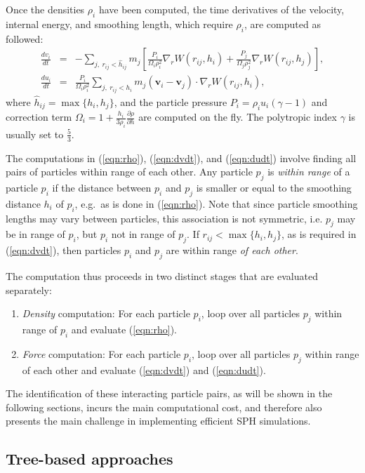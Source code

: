 \documentclass[final]{siamltex}
\newcommand{\eqn}[1]
    {(\ref{eqn:#1})}
\begin{document}
Once the densities $\rho_i$ have been computed,
the time derivatives
of the velocity, internal energy, and smoothing length, which
require $\rho_i$, are computed as followed:
%
\begin{eqnarray}
    \frac{dv_i}{dt} & = & -\sum_{j,~r_{ij} < \hat{h}_{ij}} m_j \left[
        \frac{P_i}{\Omega_i\rho_i^2}\nabla_rW(r_{ij},h_i) +
        \frac{P_j}{\Omega_j\rho_j^2}\nabla_rW(r_{ij},h_j) \right], \label{eqn:dvdt} \\ 
    \frac{du_i}{dt} & = & \frac{P_i}{\Omega_i\rho_i^2} \sum_{j,~r_{ij} < h_i} m_j(\mathbf v_i - \mathbf v_j) \cdot \nabla_rW(r_{ij},h_i), \label{eqn:dudt}
\end{eqnarray}
%
where $\hat{h}_{ij} = \max\{h_i,h_j\}$, and the particle pressure
$P_i=\rho_i u_i (\gamma-1)$ and correction term
$\Omega_i=1 + \frac{h_i}{3\rho_i}\frac{\partial \rho}{\partial h}$
are computed on the fly.
The polytropic index $\gamma$ is usually set to $\frac{5}{3}$.

The computations in \eqn{rho}, \eqn{dvdt}, and \eqn{dudt}
involve finding all pairs of particles
within range of each other.
Any particle $p_j$ is {\em within range} of a particle $p_i$
if the distance between $p_i$ and $p_j$ is smaller or equal
to the smoothing distance $h_i$ of $p_i$, e.g.~as is done in \eqn{rho}.
Note that since particle smoothing lengths may vary between particles,
this association is not symmetric, i.e. $p_j$ may be in range of
$p_i$, but $p_i$ not in range of $p_j$.
If $r_{ij} < \max\{h_i,h_j\}$, as is required in \eqn{dvdt},
then particles $p_i$ and $p_j$ are within range
{\em of each other}.

The computation thus proceeds in two distinct stages that are
evaluated separately:
\begin{enumerate}
    \item {\em Density} computation: For each particle $p_i$,
        loop over all particles $p_j$ within range of $p_i$ and evaluate
        \eqn{rho}.
    \item {\em Force} computation: For each particle $p_i$,
        loop over all particles $p_j$
        within range of each other and evaluate \eqn{dvdt} and \eqn{dudt}.
\end{enumerate}
The identification of these interacting particle pairs,
as will be shown in the following sections, incurs the main computational
cost, and therefore also presents the main challenge in implementing efficient
SPH simulations.


\subsection{Tree-based approaches}
\end{document}
